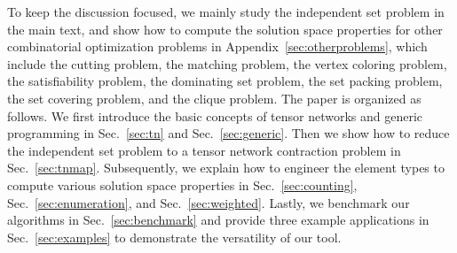 \documentclass[onefignum, onetabnum]{siamart190516}
\newcommand{\<}{\langle}
\renewcommand{\>}{\rangle}
\newcommand{\Sec}[1]{Sec.~\ref{#1}}
\newcommand{\App}[1]{Appendix~\ref{#1}}
\newcommand{\xpurple}[1]{[{\bf  \color{purple}{\sout{MC: #1}}}]}
\newcounter{example}
\begin{document}
To keep the discussion focused, we mainly study the independent set problem in the main text, and show how to compute the solution space properties for other combinatorial optimization problems in  \App{sec:otherproblems}, which include the cutting problem, the matching problem, the vertex coloring problem, the satisfiability problem, the dominating set problem, the set packing problem, the set covering problem, and the clique problem.
The paper is organized as follows.
We first introduce the basic concepts of tensor networks and generic programming in \Sec{sec:tn} and \Sec{sec:generic}.
Then we show how to reduce the independent set problem to a tensor network contraction problem in \Sec{sec:tnmap}. 
Subsequently, we explain how to engineer the element types to compute various solution space properties in \Sec{sec:counting}, \Sec{sec:enumeration}, and \Sec{sec:weighted}. %
Lastly, we benchmark our algorithms in \Sec{sec:benchmark} and provide three example applications in \Sec{sec:examples} to demonstrate the versatility of our tool.
\end{document}
